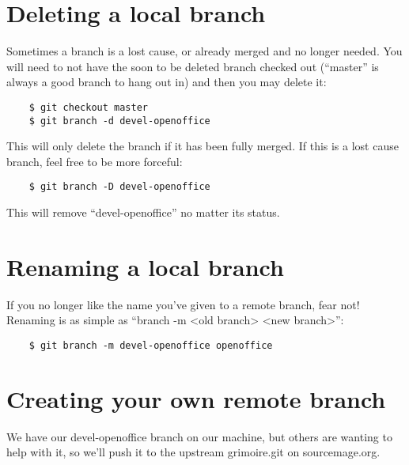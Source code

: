 \documentclass[a4paper,10pt]{book}
\begin{document}
\section{Deleting a local branch}
Sometimes a branch is a lost cause, or already merged and no longer needed.
You will need to not have the soon to be deleted branch checked out
(``master'' is always a good branch to hang out in) and then you may delete it:
\begin{verbatim}
	$ git checkout master
	$ git branch -d devel-openoffice
\end{verbatim}
This will only delete the branch if it has been fully merged. If this is a
lost cause branch, feel free to be more forceful:
\begin{verbatim}
	$ git branch -D devel-openoffice
\end{verbatim}
This will remove ``devel-openoffice'' no matter its status.

\section{Renaming a local branch}
If you no longer like the name you've given to a remote branch, fear not!
Renaming is as simple as ``branch -m <old branch> <new branch>'':
\begin{verbatim}
	$ git branch -m devel-openoffice openoffice
\end{verbatim}

\section{Creating your own remote branch}
We have our devel-openoffice branch on our machine, but others are wanting to
help with it, so we'll push it to the upstream grimoire.git on sourcemage.org.
\end{document}
